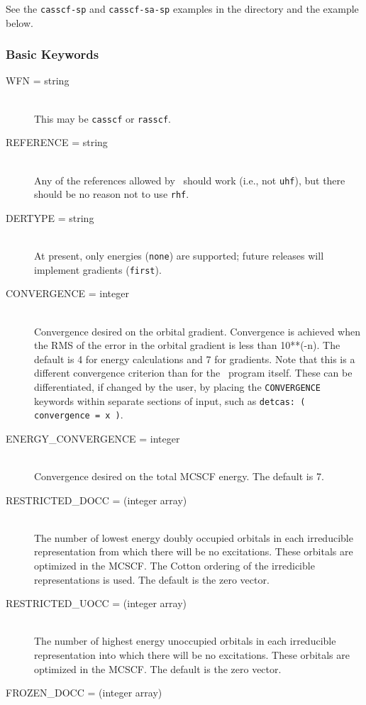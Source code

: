 See the {\tt casscf-sp} and {\tt casscf-sa-sp} examples in the 
 directory and the example below.

\subsubsection{Basic Keywords}
\begin{description}
\item[WFN = string]\mbox{}\\
This may be {\tt casscf} or {\tt rasscf}.
\item[REFERENCE = string]\mbox{}\\
Any of the references allowed by \PSIdetci\ should work (i.e., not 
{\tt uhf}), but there should be no reason not to use {\tt rhf}.
\item[DERTYPE = string]\mbox{}\\
At present, only energies ({\tt none}) are supported; future
releases will implement gradients ({\tt first}).
\item[CONVERGENCE = integer]\mbox{}\\
Convergence desired on the orbital gradient.  Convergence is achieved when
the RMS of the error in the orbital gradient is less than 10**(-n).  The 
default is 4 for energy calculations and 7 for gradients.  Note that
this is a different convergence criterion than for the \PSIdetci\
program itself.  These can be differentiated, if changed by the user,
by placing the {\tt CONVERGENCE} keywords within separate sections of
input, such as {\tt detcas: ( convergence = x )}.
\item[ENERGY\_CONVERGENCE = integer]\mbox{}\\
Convergence desired on the total MCSCF energy.  The default is 7.
\item[RESTRICTED\_DOCC = (integer array)]\mbox{}\\
The number of lowest energy doubly occupied orbitals in each irreducible
representation from which there will be no excitations.  
These orbitals are optimized in the MCSCF.
The Cotton ordering of the irredicible representations is used.
The default is the zero vector.
\item[RESTRICTED\_UOCC = (integer array)]\mbox{}\\
The number of highest energy unoccupied orbitals in each irreducible
representation into which there will be no excitations.
These orbitals are optimized in the MCSCF.
The default is the zero vector.
\item[FROZEN\_DOCC = (integer array)]\mbox{}\\

\end{description}
